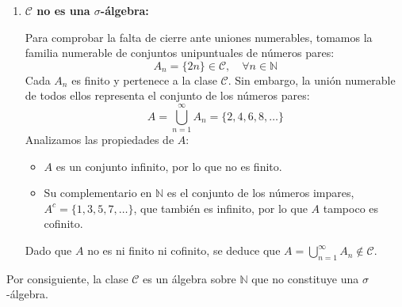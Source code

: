 \begin{problema}
\begin{enumerate}
    \item \textbf{$\mathcal{C}$ no es una $\sigma$-álgebra:}
    
    Para comprobar la falta de cierre ante uniones numerables, tomamos la familia numerable de conjuntos unipuntuales de números pares:
    \[
        A_n = \{2n\} \in \mathcal{C}, \quad \forall n \in \mathbb{N}
    \]
    Cada $A_n$ es finito y pertenece a la clase $\mathcal{C}$. Sin embargo, la unión numerable de todos ellos representa el conjunto de los números pares:
    \[
        A = \bigcup_{n=1}^\infty A_n = \{2, 4, 6, 8, \dots\}
    \]
    Analizamos las propiedades de $A$:
    \begin{itemize}
        \item $A$ es un conjunto infinito, por lo que no es finito.
        \item Su complementario en $\mathbb{N}$ es el conjunto de los números impares, $A^c = \{1, 3, 5, 7, \dots\}$, que también es infinito, por lo que $A$ tampoco es cofinito.
    \end{itemize}
    Dado que $A$ no es ni finito ni cofinito, se deduce que $A = \bigcup_{n=1}^\infty A_n \notin \mathcal{C}$.
\end{enumerate}

Por consiguiente, la clase $\mathcal{C}$ es un álgebra sobre $\mathbb{N}$ que no constituye una $\sigma$-álgebra.
\end{problema}

